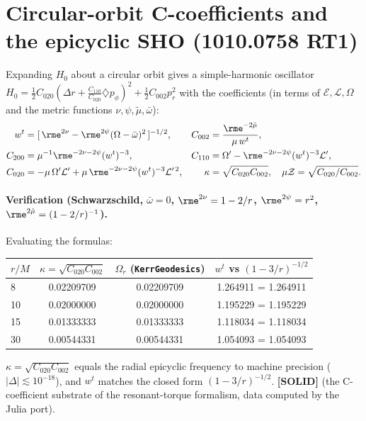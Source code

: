 \documentclass{article}
\begin{document}
\section*{Circular-orbit C-coefficients and the epicyclic SHO (1010.0758 RT1)}

Expanding $H_0$ about a circular orbit gives a simple-harmonic oscillator
$H_0=\tfrac12 C_{020}(\Delta r+\tfrac{C_{110}}{C_{020}}\diamondsuit p_\phi)^2+\tfrac12C_{002}p_r^2$ with the
coefficients (in terms of $\mathcal{E},\mathcal{L},\Omega$ and the metric functions $\nu,\psi,\tilde\mu,
\bar\omega$):
\begin{align}
  w^t &= [\,\rme^{2\nu}-\rme^{2\psi}(\Omega-\bar\omega)^2\,]^{-1/2}, &
  C_{002} &= \frac{\rme^{-2\tilde\mu}}{\mu\,w^t}, \\
  C_{200} &= \mu^{-1}\rme^{-2\nu-2\psi}(w^t)^{-3}, &
  C_{110} &= \Omega'-\rme^{-2\nu-2\psi}(w^t)^{-3}\mathcal{L}', \\
  C_{020} &= -\mu\,\Omega'\mathcal{L}'+\mu\,\rme^{-2\nu-2\psi}(w^t)^{-3}\mathcal{L}'^{\,2}, &
  \kappa &=\sqrt{C_{020}C_{002}},\quad \mu\mathcal{Z}=\sqrt{C_{020}/C_{002}} .
\end{align}

\paragraph{Verification (Schwarzschild, $\bar\omega=0$, $\rme^{2\nu}=1-2/r$, $\rme^{2\psi}=r^2$,
$\rme^{2\tilde\mu}=(1-2/r)^{-1}$).} Evaluating the formulas:
\begin{center}
\begin{tabular}{lccc}
\hline
$r/M$ & $\kappa=\sqrt{C_{020}C_{002}}$ & $\Omega_r$ (\texttt{KerrGeodesics}) & $w^t$ vs $(1-3/r)^{-1/2}$ \\
\hline
8  & 0.02209709 & 0.02209709 & 1.264911 = 1.264911 \\
10 & 0.02000000 & 0.02000000 & 1.195229 = 1.195229 \\
15 & 0.01333333 & 0.01333333 & 1.118034 = 1.118034 \\
30 & 0.00544331 & 0.00544331 & 1.054093 = 1.054093 \\
\hline
\end{tabular}
\end{center}
$\kappa=\sqrt{C_{020}C_{002}}$ equals the radial epicyclic frequency to machine precision ($|\Delta|\lesssim
10^{-18}$), and $w^t$ matches the closed form $(1-3/r)^{-1/2}$. \textbf{[SOLID]} (the C-coefficient substrate
of the resonant-torque formalism, data computed by the Julia port).
\end{document}
